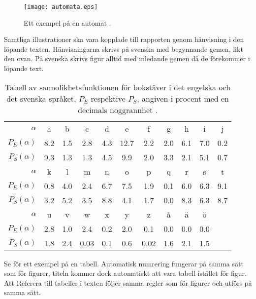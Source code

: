 \begin{figure}
	\centering
	\texttt{[image: automata.eps]} %
	\caption[Ett exempel på en automat.]{Ett exempel på en automat 
	\citep{Wikipedia2012at}.}
	\label{fig:automata}
\end{figure}

Samtliga illustrationer ska vara kopplade till rapporten genom hänvisning i den 
löpande texten.
Hänvisningarna skrivs på svenska med begynnande gemen, likt den ovan.
På svenska skrivs figur alltid med inledande gemen då de förekommer i löpande 
text.

\begin{table}
	\centering\small
  \begin{tabular}{r|cccccccccc}
    \hline\hline
    \(\alpha\) & a & b & c & d & e & f & g & h & i & j \\
    \(P_E(\alpha)\) & 8.2  & 1.5 & 2.8 & 4.3 & 12.7 & 2.2 & 2.0 &
    6.1 & 7.0 & 0.2 \\
    \(P_S(\alpha)\) & 9.3  & 1.3 & 1.3 & 4.5 & 9.9 & 2.0 & 3.3 &
    2.1 & 5.1 & 0.7 \\
    \hline\hline
    \(\alpha\) & k & l & m & n & o & p & q & r & s & t \\
    \(P_E(\alpha)\) & 0.8 & 4.0 & 2.4 & 6.7 & 7.5 & 1.9 & 0.1 & 6.0 & 6.3 &
    9.1 \\
    \(P_S(\alpha)\) & 3.2 & 5.2 & 3.5 & 8.8 & 4.1 & 1.7 & 0.0 & 8.3 & 6.3 &
    8.7 \\
    \hline\hline
    \(\alpha\) & u & v & w & x & y & z & å & ä & ö \\
    \(P_E(\alpha)\) & 2.8 & 1.0 & 2.4 & 0.2 & 2.0 & 0.1 & 0.0 & 0.0 & 0.0 \\
    \(P_S(\alpha)\) & 1.8 & 2.4 & 0.03 & 0.1 & 0.6 & 0.02 & 1.6 & 2.1 &
    1.5 \\
    \hline\hline
  \end{tabular}
	\caption[Tabell av sannolikhetsfunktionen för bokstäver i det engelska 
	respektive svenska språket.]
	{Tabell av sannolikhetsfunktionen för bokstäver i det engelska och det 
	svenska språket, \(P_E\) respektive \(P_S\), angiven i procent med en 
	decimals noggrannhet \citep{Wikipedia2011lf}.}
  \label{tbl:freq}
\end{table}

Se  för ett exempel på en tabell.
Automatisk numrering fungerar på samma sätt som för figurer, titeln kommer dock 
automatiskt att vara tabell istället för figur.
Att Referera till tabeller i texten följer samma regler som för figurer och 
utförs på samma sätt.


